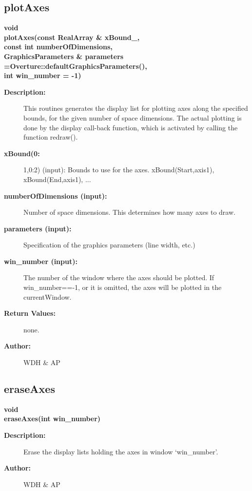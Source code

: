 \subsection{plotAxes}
 
\begin{flushleft} \textbf{%
void   \\ 
\settowidth{\GLGraphicsInterfaceIncludeArgIndent}{plotAxes(}%
plotAxes(const RealArray \& xBound\_, \\ 
\hspace{\GLGraphicsInterfaceIncludeArgIndent}const int numberOfDimensions,\\ 
GraphicsParameters \& parameters  =Overture::defaultGraphicsParameters(),\\ 
\hspace{\GLGraphicsInterfaceIncludeArgIndent}int win\_number  = -1)
}\end{flushleft}
\begin{description}
\item[{\bf Description:}] 
    This routines generates the display list for plotting axes along the specified bounds, 
    for the given number of space dimensions. The actual plotting is done by the display
    call-back function, which is activated by calling the function redraw().
\item[{\bf xBound(0:}] 1,0:2) (input): Bounds to use for the axes. {\ff xBound(Start,axis1)},
  {\ff xBound(End,axis1)}, ...
\item[{\bf numberOfDimensions (input):}]  Number of space dimensions. This determines how many
    axes to draw.
\item[{\bf parameters (input):}]  Specification of the graphics parameters (line width, etc.)
\item[{\bf win\_number (input):}]  The number of the window where the axes should be plotted. If win\_number==-1,
                       or it is omitted, the axes will be plotted in the currentWindow.
\item[{\bf Return Values:}]  none.
  
\item[{\bf Author:}]  WDH \& AP
\end{description}
\subsection{eraseAxes}
 
\begin{flushleft} \textbf{%
void   \\ 
\settowidth{\GLGraphicsInterfaceIncludeArgIndent}{eraseAxes(}%
eraseAxes(int win\_number)
}\end{flushleft}
\begin{description}
\item[{\bf Description:}] 
    Erase the display lists holding the axes in window `win\_number'.
\item[{\bf Author:}]  WDH \& AP
\end{description}
